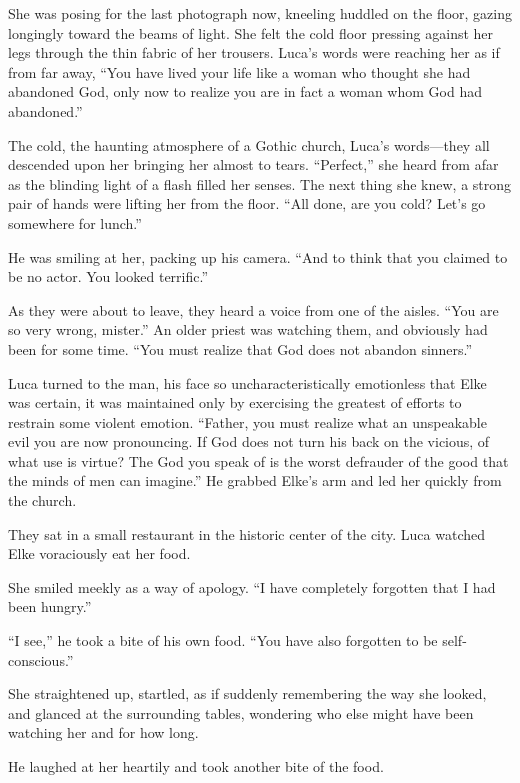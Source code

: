 She was posing for the last photograph now, kneeling huddled on the floor, gazing longingly toward the beams of light. She felt the cold floor pressing against her legs through the thin fabric of her trousers. Luca's words were reaching her as if from far away, ``You have lived your life like a woman who thought she had abandoned God, only now to realize you are in fact a woman whom God had abandoned.''

The cold, the haunting atmosphere of a Gothic church, Luca's words---they all descended upon her bringing her almost to tears. ``Perfect,'' she heard from afar as the blinding light of a flash filled her senses. The next thing she knew, a strong pair of hands were lifting her from the floor. ``All done, are you cold? Let's go somewhere for lunch.''

He was smiling at her, packing up his camera. ``And to think that you claimed to be no actor. You looked terrific.''

As they were about to leave, they heard a voice from one of the aisles. ``You are so very wrong, mister.'' An older priest was watching them, and obviously had been for some time. ``You must realize that God does not abandon sinners.''

Luca turned to the man, his face so uncharacteristically emotionless that Elke was certain, it was maintained only by exercising the greatest of efforts to restrain some violent emotion. ``Father, you must realize what an unspeakable evil you are now pronouncing. If God does not turn his back on the vicious, of what use is virtue? The God you speak of is the worst defrauder of the good that the minds of men can imagine.'' He grabbed Elke's arm and led her quickly from the church.

\sectionline

They sat in a small restaurant in the historic center of the city. Luca watched Elke voraciously eat her food.

She smiled meekly as a way of apology. ``I have completely forgotten that I had been hungry.''

``I see,'' he took a bite of his own food. ``You have also forgotten to be self-conscious.''

She straightened up, startled, as if suddenly remembering the way she looked, and glanced at the surrounding tables, wondering who else might have been watching her and for how long.

He laughed at her heartily and took another bite of the food.

